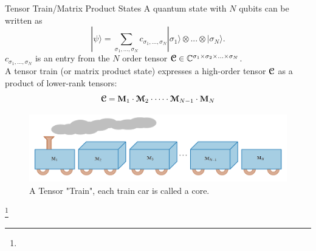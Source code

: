 \documentclass{beamer}
\newcommand{\euler}[1]{\boldsymbol{\EuScript{#1}}}
\newcommand{\romanL}[1]{\boldsymbol{\mathrm{#1}}}
\newcommand\blfootnote[1]{%
  \begingroup
  \renewcommand\thefootnote{}\footnote{#1}%
  \addtocounter{footnote}{-1}%
  \endgroup
}
\begin{document}
\begin{frame}{Tensor Train/Matrix Product States}
    \small
    A quantum state with $N$ qubits can be written as \begin{equation}
        |\psi\rangle = \sum_{\sigma_1,...,\sigma_N}c_{\sigma_1,...,\sigma_N}|\sigma_1\rangle\otimes...\otimes|\sigma_N\rangle.
    \end{equation}
    \pause
    $c_{\sigma_1,...,\sigma_N}$ is an entry from the $N$ order tensor $\euler{C} \in \mathbb{C}^{\sigma_1 \times \sigma_2 \times ... \times \sigma_N}$. \\
    \pause
    A tensor train (or matrix product state) expresses a high-order tensor $\euler{C}$ as a product of lower-rank tensors:
    \begin{equation}
        \euler{C} = \romanL{M}_1 \cdot \euler{M}_2 \cdot \dots \cdot \euler{M}_{N-1} \cdot \romanL{M}_N
    \end{equation}
    
    \begin{figure}
        \centering
        \includegraphics[width=0.90\linewidth]{images/Misc/TensorTrain.png}
        \caption{A Tensor "Train", each train car is called a core.}
        \label{fig:TensorTrain}
    \end{figure}
    \blfootnote{}
\end{frame}
\end{document}
